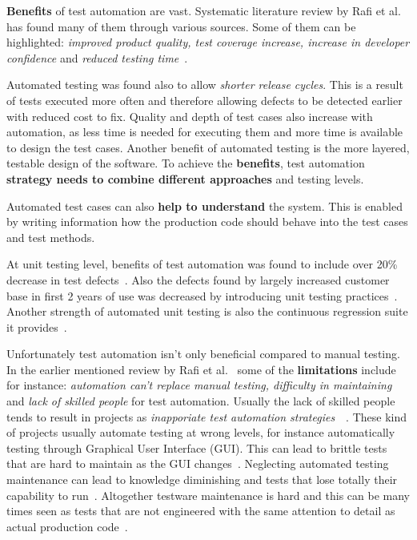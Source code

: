     \textbf{Benefits} of test automation are vast. Systematic literature review by Rafi et al.~\cite{rafi2012benefits} has found many
    of them through various sources. Some of them can be highlighted: \textit{improved product quality, test coverage increase,
    increase in developer confidence} and \textit{reduced testing time}~\cite{rafi2012benefits}.

    Automated testing was found also to allow \textit{shorter release cycles}. This is a result of
    tests executed more often and therefore allowing defects to be detected earlier with reduced cost to fix.
    Quality and depth of test cases also increase with automation, as less time is needed for executing them and more time is available
    to design the test cases. Another benefit of automated testing is the more layered, testable design of the software.
    To achieve the \textbf{benefits}, test automation \textbf{strategy needs to combine different approaches} and testing levels. ~\cite{berner2005observations}

    Automated test cases can also \textbf{help to understand} the system. This is enabled by writing information how the production code should behave
    into the test cases and test methods. ~\cite{langr2015pragmatic}~\cite{chelimsky2010rspec}~\cite{kapelonis2016java}

    At unit testing level, benefits of test automation was found to include over 20\% decrease in test defects~\cite{williams2009effectiveness}.
    Also the defects found by largely increased customer base in first 2 years of use was decreased by introducing unit testing practices~\cite{williams2009effectiveness}.
    Another strength of automated unit testing is also the continuous regression suite it provides~\cite{runeson2006survey}.

    Unfortunately test automation isn't only beneficial compared to manual testing. In the earlier mentioned review by Rafi et al.~\cite{rafi2012benefits}
    some of the \textbf{limitations} include for instance: \textit{automation can't replace manual testing, difficulty in maintaining}
    and \textit{lack of skilled people} for test automation. Usually the lack of skilled people tends to result in projects as
    \textit{inapporiate test automation strategies}~\cite{rafi2012benefits}~\cite{berner2005observations}. These kind of projects
    usually automate testing at wrong levels, for instance automatically testing through Graphical User Interface (GUI). This
    can lead to brittle tests that are hard to maintain as the GUI changes~\cite{berner2005observations}. Neglecting automated
    testing maintenance can lead to knowledge diminishing and tests that lose totally their capability to run~\cite{berner2005observations}.
    Altogether testware maintenance is hard and this can be many times seen as tests that are not engineered
    with the same attention to detail as actual production code~\cite{berner2005observations}.

